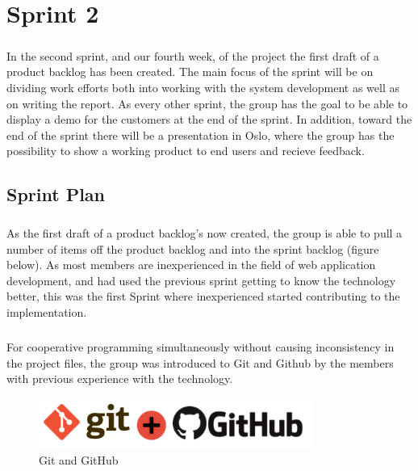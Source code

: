 
\chapter{Sprint 2}

\paragraph{} In the second sprint, and our fourth week, of the project the first draft of a product backlog has been created. The main focus of the sprint will be on dividing work efforts both into working with the system development as well as on writing the report. As every other sprint, the group has the goal to be able to display a demo for the customers at the end of the sprint. In addition, toward the end of the sprint there will be a presentation in Oslo, where the group has the possibility to show a working product to end users and recieve feedback.

\section{Sprint Plan} \paragraph{} As the first draft of a product backlog’s now created, the group is able to pull a number of items off the product backlog and into the sprint backlog (figure below). As most members are inexperienced in the field of web application development, and had used the previous sprint getting to know the technology better, this was the first Sprint where inexperienced started contributing to the implementation. 

\paragraph{}For cooperative programming simultaneously without causing inconsistency in the project files, the group was introduced to Git and Github by the members with previous experience with the technology. 

\begin{figure}[ht!]
\centering
\includegraphics[width=90mm]{Sprint2/img/Sprint2-GitnGithub.png}
\caption{Git and GitHub \label{overflow}}
\end{figure}


